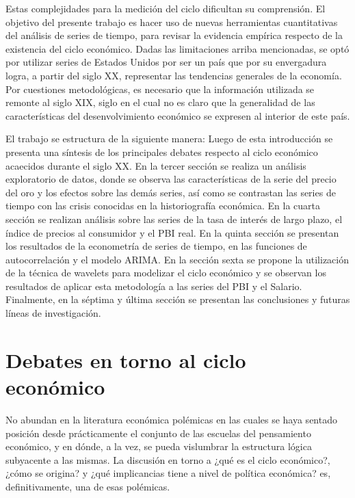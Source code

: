 \documentclass[a4paper]{article}
\begin{document}
Estas complejidades para la medición del ciclo dificultan su comprensión. El objetivo del presente trabajo es hacer uso de nuevas herramientas cuantitativas del análisis de series de tiempo, para revisar la evidencia empírica respecto de la existencia del ciclo económico. Dadas las limitaciones arriba mencionadas, se optó por utilizar series de Estados Unidos por ser un país que por su envergadura logra, a partir del siglo XX, representar las tendencias generales de la economía. Por cuestiones metodológicas, es necesario que la información utilizada se remonte al siglo XIX, siglo en el cual no es claro que la generalidad de las características del desenvolvimiento económico se expresen al interior de este país. 

El trabajo se estructura de la siguiente manera: Luego de esta introducción se presenta una síntesis de los principales debates respecto al ciclo económico acaecidos durante el siglo XX. En la tercer sección se realiza un análisis exploratorio de datos, donde se observa las características de la serie del precio del oro y los efectos sobre las demás series, así como se contrastan las series de tiempo con las crisis conocidas en la historiografía económica. En la cuarta sección se realizan análisis sobre las series de la tasa de interés de largo plazo, el índice de precios al consumidor y el PBI real. En la quinta sección se presentan los resultados de la econometría de series de tiempo, en las funciones de autocorrelación y el modelo ARIMA. En la sección sexta se propone la utilización de la técnica de wavelets para modelizar el ciclo económico y se observan los resultados de aplicar esta metodología a las series del PBI y el Salario. Finalmente, en la séptima y última sección se presentan las conclusiones y futuras líneas de investigación.


\section{Debates en torno al ciclo económico}

No abundan en la literatura económica polémicas en las cuales se haya sentado posición desde prácticamente el conjunto de las escuelas del pensamiento económico, y en dónde, a la vez, se pueda vislumbrar la estructura lógica subyacente a las mismas. La discusión en torno a ¿qué es el ciclo económico?, ¿cómo se origina?  y ¿qué implicancias tiene a nivel de política económica? es, definitivamente, una de esas polémicas.
\end{document}
